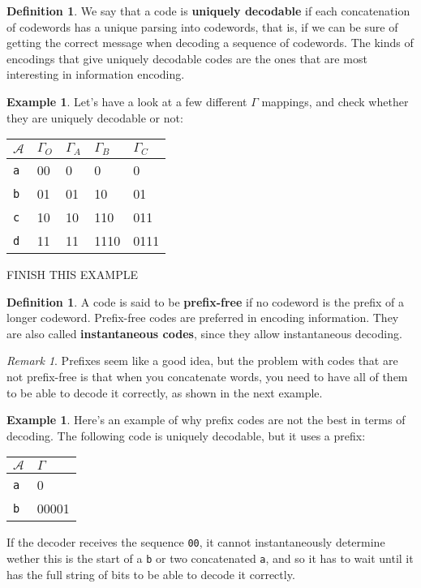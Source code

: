 \documentclass{report}
\theoremstyle{plain}
\theoremstyle{definition}
\newtheorem{exmp}[thm]{Example}
\newtheorem{defn}[thm]{Definition}
\theoremstyle{remark}
\newtheorem*{remark}{Remark}
\begin{document}
\begin{defn}
	We say that a code is \textbf{uniquely decodable} if each concatenation of codewords has a unique parsing into codewords, that is, if we can be sure of getting the correct message when decoding a sequence of codewords. The kinds of encodings that give uniquely decodable codes are the ones that are most interesting in information encoding. 
\end{defn}

\begin{exmp}
Let's have a look at a few different $\Gamma$ mappings, and check whether they are uniquely decodable or not:
\begin{center}
	\begin{tabular}{l | l l l l}
		$\mathcal A$ & $\Gamma_O$ & $\Gamma_A$ & $\Gamma_B$ & $\Gamma_C$ \\ \hline
		\texttt a & 00 & 0 & 0 & 0 \\
		\texttt b & 01 & 01 & 10 & 01 \\
		\texttt c & 10 & 10 & 110 & 011 \\
		\texttt d & 11 & 11 & 1110 & 0111
	\end{tabular}
\end{center}
FINISH THIS EXAMPLE
\end{exmp}

\begin{defn}
	A code is said to be \textbf{prefix-free} if no codeword is the prefix of a longer codeword. Prefix-free codes are preferred in encoding information. They are also called \textbf{instantaneous codes}, since they allow instantaneous decoding.
\end{defn}
\begin{remark} Prefixes seem like a good idea, but the problem with codes that are not prefix-free is that when you concatenate words, you need to have all of them to be able to decode it correctly, as shown in the next example.
\end{remark}

\begin{exmp} Here's an example of why prefix codes are not the best in terms of decoding. The following code is uniquely decodable, but it uses a prefix:
\begin{center}
	\begin{tabular}{l | l} 
		$\mathcal A$ & $\Gamma$ \\ \hline
		\texttt a & 0 \\
		\texttt b & 00001
	\end{tabular}
\end{center}
If the decoder receives the sequence \texttt{00}, it cannot instantaneously determine wether this is the start of a \texttt{b} or two concatenated \texttt{a}, and so it has to wait until it has the full string of bits to be able to decode it correctly.
\end{exmp}
\end{document}
